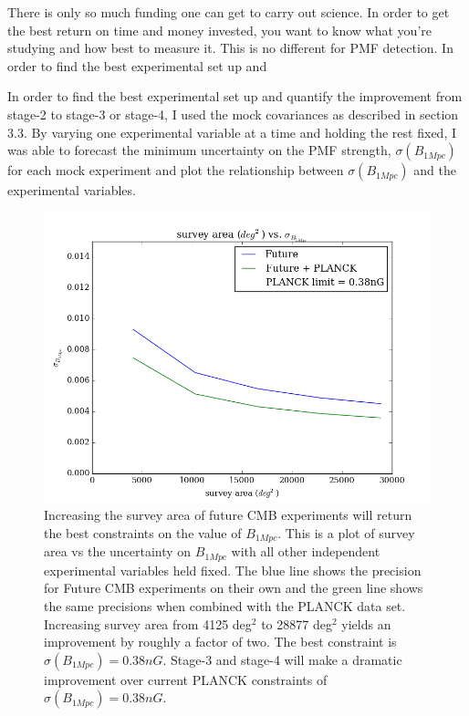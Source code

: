 There is only so much funding one can get to carry out science. In order to get the best return on time and money invested, you want to know what you're studying and how best to measure it. This is no different for PMF detection. In order to find the best experimental set up and

In order to find the best experimental set up and quantify the improvement from stage-2 to stage-3 or stage-4, I used the mock covariances as described in section 3.3. By varying one experimental variable at a time and holding the rest fixed, I was able to forecast the minimum uncertainty on the PMF strength, $\sigma(B_{1Mpc})$ for each mock experiment and plot the relationship between $\sigma(B_{1Mpc})$ and the experimental variables.

\begin{figure}[h]
\centering
\includegraphics[scale=0.7]{images/area.png}
\caption{Increasing the survey area of future CMB experiments will return the best constraints on the value of $B_{1Mpc}$. This is a plot of survey area vs the uncertainty on $B_{1Mpc}$ with all other independent experimental variables held fixed. The blue line shows the precision for Future CMB experiments on their own and the green line shows the same precisions when combined with the PLANCK data set. Increasing survey area from 4125 deg$^2$ to 28877 deg$^2$ yields an improvement by roughly a factor of two. The best constraint is $\sigma(B_{1Mpc}) = 0.38nG$. Stage-3 and stage-4 will make a dramatic improvement over current PLANCK constraints of $\sigma(B_{1Mpc}) = 0.38nG$.}
\label{fig:area}
\end{figure}

